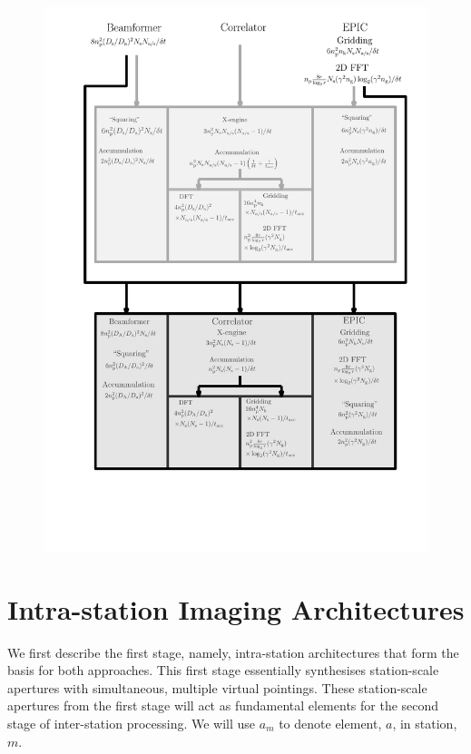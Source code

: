 \documentclass[
  journal=pasa,
  manuscript=article-type,
  year=2020,
  volume=37,
]{cup-journal}
\begin{document}
\begin{figure}
\includegraphics[width=\linewidth]{figures/flops_calc.pdf}
\caption{
\label{fig:hybrid-architectures-cost-schematic}}
\end{figure}

\section{Intra-station Imaging Architectures} \label{sec:intra-station-arch}

We first describe the first stage, namely, intra-station architectures that form the basis for both approaches. This first stage essentially synthesises station-scale apertures with simultaneous, multiple virtual pointings. These station-scale apertures from the first stage will act as fundamental elements for the second stage of inter-station processing. We will use $a_m$ to denote element, $a$, in station, $m$.
\end{document}
